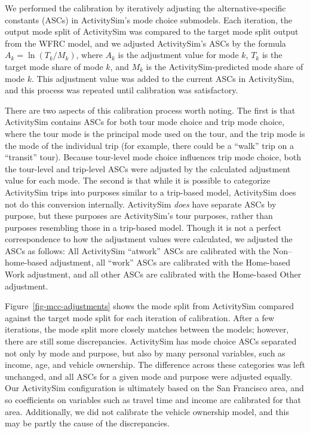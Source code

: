 \documentclass[fancy, twoside, mastersfancy, ms]{byuthesis}
\begin{document}
We performed the calibration by iteratively adjusting the
alternative-specific constants (ASCs) in ActivitySim's mode choice
submodels. Each iteration, the output mode split of ActivitySim was
compared to the target mode split output from the WFRC model, and we
adjusted ActivitySim's ASCs by the formula \(A_k = \ln(T_k/M_k)\), where
\(A_k\) is the adjustment value for mode \(k\), \(T_k\) is the target
mode share of mode \(k\), and \(M_k\) is the ActivitySim-predicted mode
share of mode \(k\). This adjustment value was added to the current ASCs
in ActivitySim, and this process was repeated until calibration was
satisfactory.

There are two aspects of this calibration process worth noting. The
first is that ActivitySim contains ASCs for both tour mode choice and
trip mode choice, where the tour mode is the principal mode used on the
tour, and the trip mode is the mode of the individual trip (for example,
there could be a ``walk'' trip on a ``transit'' tour). Because
tour-level mode choice influences trip mode choice, both the tour-level
and trip-level ASCs were adjusted by the calculated adjustment value for
each mode. The second is that while it is possible to categorize
ActivitySim trips into purposes similar to a trip-based model,
ActivitySim does not do this conversion internally. ActivitySim
\emph{does} have separate ASCs by purpose, but these purposes are
ActivitySim's tour purposes, rather than purposes resembling those in a
trip-based model. Though it is not a perfect correspondence to how the
adjustment values were calculated, we adjusted the ASCs as follows: All
ActivitySim ``atwork'' ASCs are calibrated with the Non--home-based
adjustment, all ``work'' ASCs are calibrated with the Home-based Work
adjustment, and all other ASCs are calibrated with the Home-based Other
adjustment.

Figure~\ref{fig-mcc-adjustments} shows the mode split from ActivitySim
compared against the target mode split for each iteration of
calibration. After a few iterations, the mode split more closely matches
between the models; however, there are still some discrepancies.
ActivitySim has mode choice ASCs separated not only by mode and purpose,
but also by many personal variables, such as income, age, and vehicle
ownership. The difference across these categories was left unchanged,
and all ASCs for a given mode and purpose were adjusted equally. Our
ActivitySim configuration is ultimately based on the San Francisco area,
and so coefficients on variables such as travel time and income are
calibrated for that area. Additionally, we did not calibrate the vehicle
ownership model, and this may be partly the cause of the discrepancies.
\end{document}

